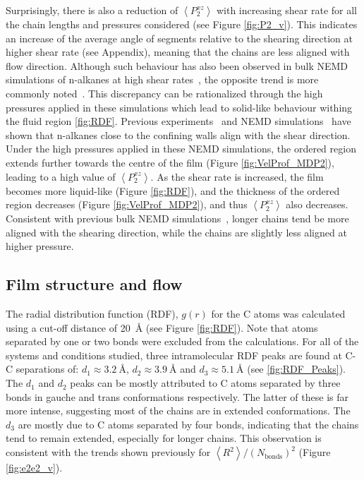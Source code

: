 \documentclass[5p]{elsarticle}
\begin{document}
Surprisingly, there is also a reduction of $\left<P_{2}^{xz} \right> $ with increasing shear rate for all the chain lengths and pressures considered (see Figure \ref{fig:P2_v}). This indicates an increase of the average angle of segments relative to the shearing direction at higher shear rate (see Appendix), meaning that the chains are less aligned with flow direction. Although such behaviour has also been observed in bulk NEMD simulations of n-alkanes at high shear rates~\cite{Padilla1992}, the opposite trend is more commonly noted~\cite{Cho2017,Cui1996}. This discrepancy can be rationalized through the high pressures applied in these simulations which lead to solid-like behaviour withing the fluid region \ref{fig:RDF}. Previous experiments~\cite{Drummond2002} and NEMD simulations~\cite{Cho2017} have shown that n-alkanes close to the confining walls align with the shear direction. Under the high pressures applied in these NEMD simulations, the ordered region extends further towards the centre of the film (Figure \ref{fig:VelProf_MDP2}), leading to a high value of $\left<P_{2}^{xz} \right> $. As the shear rate is increased, the film becomes more liquid-like (Figure \ref{fig:RDF}), and the thickness of the ordered region decreases (Figure \ref{fig:VelProf_MDP2}), and thus $\left<P_{2}^{xz} \right> $ also decreases. Consistent with previous bulk NEMD simulations~\cite{Cui1996}, longer chains tend be more aligned with the shearing direction, while the chains are slightly less aligned at higher pressure.

\subsection{Film structure and flow}
\label{str}

The radial distribution function (RDF), $g(r)$ for the C atoms was calculated using a cut-off distance of \SI{20}{\angstrom} (see Figure \ref{fig:RDF}). Note that atoms separated by one or two bonds were excluded from the calculations. For all of the systems and conditions studied, three intramolecular RDF peaks are found at C-C separations of: $d_1 \approx \SI{3.2}{\angstrom}$, $d_2 \approx \SI{3.9}{\angstrom}$ and $d_3 \approx \SI{5.1}{\angstrom}$ (see \ref{fig:RDF_Peaks}). The $d_1$ and $d_2$ peaks can be mostly attributed to C atoms separated by three bonds in gauche and trans conformations respectively. The latter of these is far more intense, suggesting most of the chains are in extended conformations. The $d_3$ are mostly due to C atoms separated by four bonds, indicating that the chains tend to remain extended, especially for longer chains. This observation is consistent with the trends shown previously for $\left< R^2 \right>/\left(N_\text{bonds}\right)^2$ (Figure \ref{fig:e2e2_v}).
\end{document}
